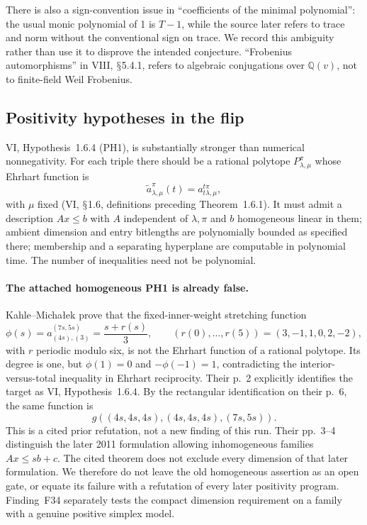 \documentclass[11pt,a4paper]{article}
\newcommand{\Q}{\mathbb Q}\newcommand{\Z}{\mathbb Z}\newcommand{\C}{\mathbb C}\newcommand{\N}{\mathbb N}\newcommand{\F}{\mathbb F}
\renewcommand{\S}{\ensuremath{\mathsection}}
\newcommand{\fid}[1]{\textsf{#1}}\newcommand{\gate}[1]{\textsf{#1}}
\theoremstyle{named}\newtheorem{finding}{Finding}[section]
\theoremstyle{definition}\newtheorem{definition}[finding]{Definition}
\theoremstyle{remark}\newtheorem{remark}[finding]{Remark}
\begin{document}
There is also a sign-convention issue in ``coefficients of the minimal polynomial'': the usual monic polynomial of 1 is $T-1$, while the source later refers to trace and norm without the conventional sign on trace. We record this ambiguity rather than use it to disprove the intended conjecture. ``Frobenius automorphisms'' in VIII, \S5.4.1, refers to algebraic conjugations over $\Q(v)$, not to finite-field Weil Frobenius.

\subsection{Positivity hypotheses in the flip}
VI, Hypothesis~1.6.4 (PH1), is substantially stronger than numerical nonnegativity. For each triple there should be a rational polytope $P_{\lambda,\mu}^{\pi}$ whose Ehrhart function is
\[
 \widetilde a_{\lambda,\mu}^{\pi}(t)=a_{t\lambda,\mu}^{t\pi},
\]
with $\mu$ fixed (VI, \S1.6, definitions preceding Theorem~1.6.1). It must admit a description $Ax\le b$ with $A$ independent of $\lambda,\pi$ and $b$ homogeneous linear in them; ambient dimension and entry bitlengths are polynomially bounded as specified there; membership and a separating hyperplane are computable in polynomial time. The number of inequalities need not be polynomial.


\paragraph{The attached homogeneous PH1 is already false.}
Kahle--Micha{\l}ek \cite[Theorem~5 and Remark~6, p.~4]{KM}
prove that the fixed-inner-weight stretching function
\[
 \phi(s)=a_{(4s),(3)}^{(7s,5s)}
       =\frac{s+r(s)}3,\qquad
 (r(0),\ldots,r(5))=(3,-1,1,0,2,-2),
\]
with $r$ periodic modulo six, is not the Ehrhart function of a
rational polytope. Its degree is one, but $\phi(1)=0$ and
$-\phi(-1)=1$, contradicting the interior-versus-total inequality
in Ehrhart reciprocity. Their p.~2 explicitly identifies the target
as VI, Hypothesis~1.6.4. By the rectangular identification on their
p.~6, the same function is
\[
 g((4s,4s,4s),(4s,4s,4s),(7s,5s)).
\]
This is a cited prior refutation, not a new finding of this run.
Their pp.~3--4 distinguish the later 2011 formulation allowing
inhomogeneous families $Ax\le sb+c$. The cited theorem does not
exclude every dimension of that later formulation. We therefore
do not leave the old homogeneous assertion as an open gate, or
equate its failure with a refutation of every later positivity
program. Finding~\fid{F34} separately tests the compact dimension
requirement on a family with a genuine positive simplex model.
\end{document}
